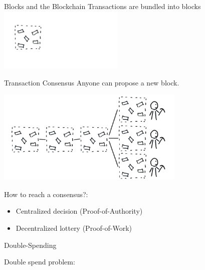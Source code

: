 \documentclass[]{beamer}
\begin{document}
\begin{frame}{Blocks and the Blockchain}
Transactions are bundled into blocks \\
\includegraphics[width=6cm]{../assets/images/block_1.png} \\
\end{frame}


\begin{frame}{Transaction Consensus}
Anyone can propose a new block. \\ \vspace{1.5em}


\includegraphics[width=9cm]{../assets/images/consensus_problem.png}

How to reach a consensus?: \\
	\begin{itemize}
	\item Centralized decision (Proof-of-Authority)
	\item \color{focus}Decentralized lottery (Proof-of-Work)
	\end{itemize} 
\end{frame}


\begin{frame}{Double-Spending}

Double spend problem: \\
\begin{figure}[h!]
	\center
	
\end{figure}
\end{frame}
\end{document}
